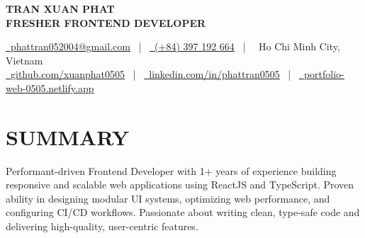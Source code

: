 \documentclass[10pt,a4paper]{article}
\begin{document}

\begin{center}
    {\Huge \bfseries \color{primaryColor} TRAN XUAN PHAT} \\
    \vspace{4pt}
    {\large \bfseries \color{accentColor} FRESHER FRONTEND DEVELOPER} \\
    \vspace{8pt}
    
    \small
    \href{mailto:phattran052004@gmail.com}{\color{primaryColor}\faEnvelope\ \underline{phattran052004@gmail.com}} \ | \ 
    \href{tel:+84397192664}{\color{primaryColor}\faPhone\ (+84) 397 192 664} \ | \ 
    {\color{primaryColor}\faMapMarker*}\ Ho Chi Minh City, Vietnam \\
    \vspace{4pt}
    \href{https://github.com/xuanphat0505}{\color{primaryColor}\faGithub\ \underline{github.com/xuanphat0505}} \ | \ 
    \href{https://linkedin.com/in/phattran0505}{\color{primaryColor}\faLinkedin\ \underline{linkedin.com/in/phattran0505}} \ | \ 
    \href{https://portfolio-web-0505.netlify.app/}{\color{primaryColor}\faGlobe\ \underline{portfolio-web-0505.netlify.app}}
\end{center}

\vspace{1pt}

\section*{SUMMARY}
Performant-driven Frontend Developer with 1+ years of experience building responsive and scalable web applications using ReactJS and TypeScript. Proven ability in designing modular UI systems, optimizing web performance, and configuring CI/CD workflows. Passionate about writing clean, type-safe code and delivering high-quality, user-centric features.

\vspace{1pt}
\end{document}
